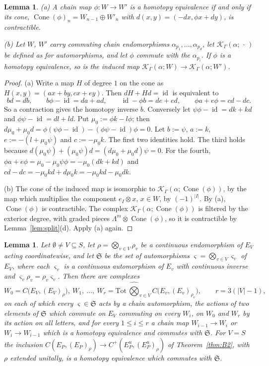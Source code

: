\documentclass[11pt]{amsart}
\newtheorem{lemma}[theorem]{Lemma}
\theoremstyle{definition}
\theoremstyle{remark}
\newcommand{\id}{\operatorname{id}}
\begin{document}
\begin{lemma}\label{lem:cone}
{\rm(a)} A chain map $\phi:W\to W'$ is a homotopy equivalence if and only if
its cone, $\operatorname{Cone}(\phi)_n=W_{n-1}\oplus W'_n$ with
$d(x,y)=(-dx,\phi x+dy)$, is contractible.

{\rm(b)} Let $W$, $W'$ carry commuting chain endomorphisms
$\alpha_{p_1},\dots,\alpha_{p_d}$, let $\mathcal K_{\Gamma}(\alpha;\,\cdot\,)$ be
defined as for automorphisms, and let $\phi$ commute with the $\alpha_{p_i}$.
If $\phi$ is a homotopy equivalence, so is the induced map
$\mathcal K_{\Gamma}(\alpha;W)\to\mathcal K_{\Gamma}(\alpha;W')$.
\end{lemma}

\begin{proof}
(a) Write a map $H$ of degree $1$ on the cone as $H(x,y)=(ax+by,cx+ey)$.  Then
$dH+Hd=\id$ is equivalent to
\[
bd=db,\qquad b\phi-\id=da+ad,\qquad \id-\phi b=de+ed,\qquad
\phi a+e\phi=cd-dc .
\]
So a contraction gives the homotopy inverse $b$.  Conversely let
$\psi\phi-\id=dk+kd$ and $\phi\psi-\id=dl+ld$.  Put $\mu_0:=\phi k-l\phi$; then
$d\mu_0+\mu_0d=\phi(\psi\phi-\id)-(\phi\psi-\id)\phi=0$.  Let $b:=\psi$, $a:=k$,
$e:=-(l+\mu_0\psi)$ and $c:=-\mu_0k$.  The first two identities hold.  The third
holds because $d(\mu_0\psi)+(\mu_0\psi)d=(d\mu_0+\mu_0d)\psi=0$.  For the fourth,
$\phi a+e\phi=\mu_0-\mu_0\psi\phi=-\mu_0(dk+kd)$ and
$cd-dc=-\mu_0kd+d\mu_0k=-\mu_0kd-\mu_0dk$.

(b) The cone of the induced map is isomorphic to
$\mathcal K_{\Gamma}(\alpha;\operatorname{Cone}(\phi))$, by the map which
multiplies the component $e_I\otimes x$, $x\in W$, by $(-1)^{|I|}$.  By (a),
$\operatorname{Cone}(\phi)$ is contractible.  The complex
$\mathcal K_{\Gamma}(\alpha;\operatorname{Cone}(\phi))$ is filtered by the
exterior degree, with graded pieces $\Lambda^{m}\otimes\operatorname{Cone}(\phi)$,
so it is contractible by Lemma~\ref{lem:split}(d).  Apply (a) again.
\end{proof}

\begin{lemma}\label{lem:equiv}
Let $\emptyset\ne V\subseteq S$, let $\rho=\bigotimes_{v\in V}\rho_v$ be a
continuous endomorphism of $E_V$ acting coordinatewise, and let $\mathfrak S$
be the set of automorphisms $\varsigma=\bigotimes_{v\in V}\varsigma_v$ of
$E_V$, where each $\varsigma_v$ is a continuous automorphism of $E_v$ with
continuous inverse and $\varsigma_v\rho_v=\rho_v\varsigma_v$.  Then there are
complexes
\[
W_0=C\bigl(E_V,(E_V)_{\rho}\bigr),\ W_1,\ \dots,\
W_r=\mathrm{Tot}\,\widehat\bigotimes_{v\in V}C\bigl(E_v,(E_v)_{\rho_v}\bigr),
\qquad r=3(|V|-1),
\]
on each of which every $\varsigma\in\mathfrak S$ acts by a chain automorphism,
the actions of two elements of $\mathfrak S$ which commute on $E_V$ commuting
on every $W_i$,
on $W_0$ and $W_r$ by its action on all letters, and for every $1\le i\le r$ a
chain map $W_{i-1}\to W_i$ or $W_i\to W_{i-1}$ which is a homotopy equivalence
and commutes with $\mathfrak S$.  For $V=S$ the inclusion
$C(E_P,(E_P)_{\rho})\to C^{+}(E_P^{u},(E_P^{u})_{\rho})$ of
Theorem~\ref{thm:B2}, with $\rho$ extended unitally, is a homotopy
equivalence which commutes with $\mathfrak S$.
\end{lemma}
\end{document}
